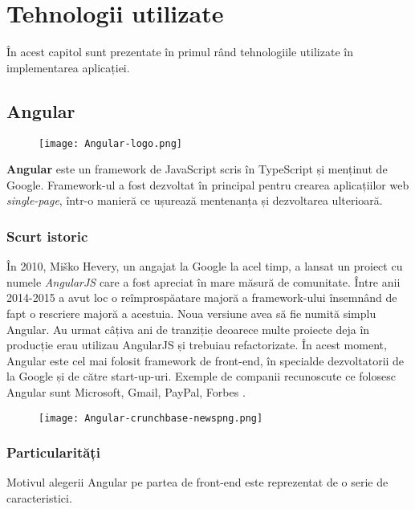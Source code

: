 \chapter{Tehnologii utilizate}

În acest capitol sunt prezentate în primul rând tehnologiile utilizate în implementarea aplicației.

\section{Angular}
\begin{figure}[H]
	\texttt{[image: Angular-logo.png]}
\end{figure}

\textbf{Angular} este un framework de JavaScript scris în TypeScript și menținut de Google. Framework-ul a fost dezvoltat în principal pentru crearea aplicațiilor web \textit{single-page}, într-o manieră ce ușurează mentenanța și dezvoltarea ulterioară.

\subsection{Scurt istoric}
În 2010, Miško Hevery, un angajat la Google la acel timp, a lansat un proiect cu numele \textit{AngularJS} care a fost apreciat în mare măsură de comunitate. Între anii 2014-2015 a avut loc o reîmprospăatare majoră a framework-ului însemnând de fapt o rescriere majoră a acestuia. Noua versiune avea să fie numită simplu Angular. Au urmat câțiva ani de tranziție deoarece multe proiecte deja în producție erau utilizau AngularJS și  trebuiau refactorizate. În acest moment, Angular este cel mai folosit framework de front-end, în specialde dezvoltatorii de la Google și de către start-up-uri. Exemple de companii recunoscute ce folosesc Angular sunt Microsoft, Gmail, PayPal, Forbes \cite{angular-history}.

\begin{figure}[H]
	\centering
	\texttt{[image: Angular-crunchbase-newspng.png]}
	\caption{\cite{angular-stats}}
\end{figure}

\subsection{Particularități}
Motivul alegerii Angular pe partea de front-end este reprezentat de o serie de caracteristici.

